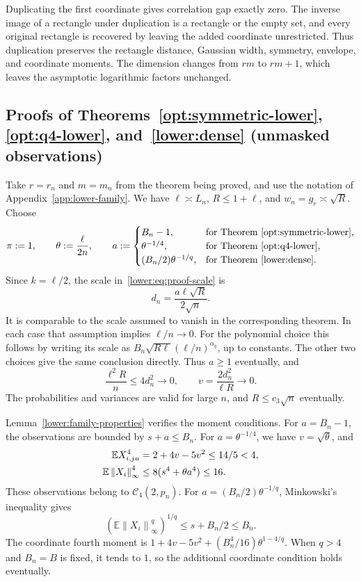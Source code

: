 \documentclass[11pt,letterpaper]{article}
\newenvironment{vSixBlock}{\color{magenta}}{}
\theoremstyle{remark}
\newcommand{\E}{\mathbb E}
\newcommand{\norm}[1]{\left\lVert#1\right\rVert}
\begin{document}
\begin{vSixBlock}
Duplicating the first coordinate gives correlation gap exactly zero.
The inverse image of a rectangle under duplication is a rectangle
or the empty set, and every original rectangle is recovered by
leaving the added coordinate unrestricted. Thus duplication preserves
the rectangle distance, Gaussian width, symmetry, envelope, and
coordinate moments. The dimension changes from \(rm\) to \(rm+1\),
which leaves the asymptotic logarithmic factors unchanged.

\subsection{Proofs of Theorems~\ref*{opt:symmetric-lower}, \ref*{opt:q4-lower}, and~\ref*{lower:dense} (unmasked observations)}
\label{app:symmetric-lower}

Take \(r=r_n\) and \(m=m_n\) from the theorem being proved,
and use the notation of Appendix~\ref{app:lower-family}. We have
\(\ell\asymp L_n\), \(R\le1+\ell\), and
\(w_n=g_r\asymp\sqrt R\). Choose
\[
 \pi:=1,\qquad \theta:=\frac{\ell}{2n},\qquad
 a:=\begin{cases}
 B_n-1,&\text{for Theorem~\ref{opt:symmetric-lower}},\\
 \theta^{-1/4},&\text{for Theorem~\ref{opt:q4-lower}},\\
 (B_n/2)\theta^{-1/q},&\text{for Theorem~\ref{lower:dense}}.
 \end{cases}
\]
Since \(k=\ell/2\), the scale in~\eqref{lower:eq:proof-scale} is
\[
 d_n=\frac{a\ell\sqrt R}{2\sqrt n}.
\]
It is comparable to the scale assumed to vanish in the corresponding
theorem. In each case that assumption implies \(\ell/n\to0\).
For the polynomial choice this follows by writing its scale as
\(B_n\sqrt{R\ell}(\ell/n)^{\alpha_q}\), up to constants.
The other two choices give the same conclusion directly.
Thus \(a\ge1\) eventually, and
\[
 \frac{\ell^2R}{n}\le4d_n^2\to0,\qquad
 v=\frac{2d_n^2}{\ell R}\to0.
\]
The probabilities and variances are valid for large \(n\), and
\(R\le c_3\sqrt n\) eventually.

Lemma~\ref{lower:family-properties} verifies the moment conditions.
For \(a=B_n-1\), the observations are bounded by \(s+a\le B_n\).
For \(a=\theta^{-1/4}\), we have \(v=\sqrt\theta\), and
\begin{align}
 \E X_{i,ju}^4&=2+4v-5v^2\le14/5<4,\notag\\
 \E\norm{X_i}_\infty^4&\le8(s^4+\theta a^4)\le16.
 \label{sym:eq:q4-moments}
\end{align}
These observations belong to \(\mathcal C_4(2,p_n)\). For
\(a=(B_n/2)\theta^{-1/q}\), Minkowski's inequality gives
\[
 (\E\norm{X_i}_\infty^q)^{1/q}\le s+B_n/2\le B_n.
\]
The coordinate fourth moment is
\(1+4v-5v^2+(B_n^4/16)\theta^{1-4/q}\).
When \(q>4\) and \(B_n=B\) is fixed, it tends to \(1\), so
the additional coordinate condition holds eventually.


\end{vSixBlock}
\end{document}
